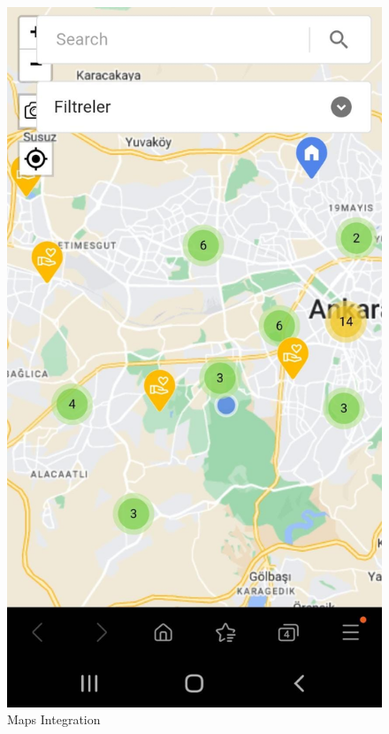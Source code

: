 \begin{figure}[H]
    \begin{center}
        \includegraphics[scale = 0.15]{assets/maps.jpeg}
        \caption[Maps Integraion]{Maps Integration}
    \end{center}
\end{figure}

